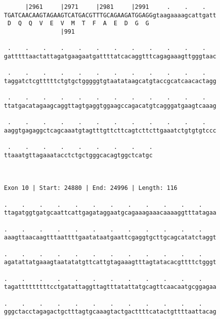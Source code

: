 \documentclass{article}
\begin{document}
\begin{Verbatim}
      |2961     |2971     |2981     |2991     .    .    .   
TGATCAACAAGTAGAAGTCATGACGTTTGCAGAAGATGGAGGgtaagaaaagcattgatt
 D  Q  Q  V  E  V  M  T  F  A  E  D  G  G                   
                |991                                        
  
 .    .    .    .    .    .    .    .    .    .    .    .   
gatttttaactattagatgaagaatgattttatcacaggtttcagagaaagttgggtaac
                                                            
 .    .    .    .    .    .    .    .    .    .    .    .   
taggatctcgtttttctgtgctgggggtgtaatataagcatgtaccgcatcaacactagg
                                                            
 .    .    .    .    .    .    .    .    .    .    .    .   
ttatgacatagaagcaggttagtgaggtggaagccagacatgtcagggatgaagtcaaag
                                                            
 .    .    .    .    .    .    .    .    .    .    .    .   
aaggtgagaggctcagcaaatgtagtttgttcttcagtcttcttgaaatctgtgtgtccc
                                                            
 .    .    .    .    .    .    .    .    .
ttaaatgttagaaatacctctgctgggcacagtggctcatgc
                                          
                                          
 
Exon 10 | Start: 24880 | End: 24996 | Length: 116
 
.    .    .    .    .    .    .    .    .    .    .    .    
ttagatggtgatgcaattcattgagataggaatgcagaaagaaacaaaaggtttatagaa
                                                            
.    .    .    .    .    .    .    .    .    .    .    .    
aaagttaacaagtttaattttgaatataatgaattcgaggtgcttgcagcatatctaggt
                                                            
.    .    .    .    .    .    .    .    .    .    .    .    
agatattatgaaagtaatatatgttcattgtagaaagtttagtatacacgttttctgggt
                                                            
.    .    .    .    .    .    .    .    .    .    .    .    
tagatttttttttcctgatattaggttagtttatattatgcagttcaacaatgcggagaa
                                                            
.    .    .    .    .    .    .    .    .    .    .    .    
gggctacctagagactgctttagtgcaaagtactgacttttcatactgttttaattacag
                                                            

\end{Verbatim}
\end{document}
